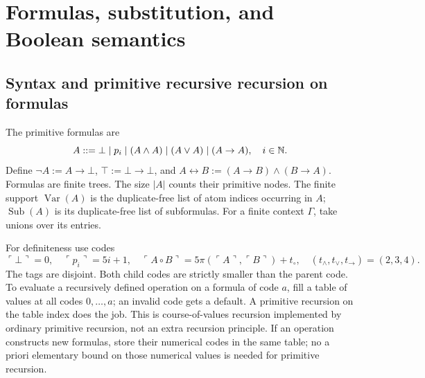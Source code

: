 \section{Formulas, substitution, and Boolean semantics}\label{sec:syntax}

\subsection{Syntax and primitive recursive recursion on formulas}

The primitive formulas are
\[
 A::=\bot\mid p_i\mid(A\wedge A)\mid(A\vee A)\mid(A\to A),\quad i\in\mathbb N.
\]
Define $\neg A:=A\to\bot$, $\top:=\bot\to\bot$, and
$A\leftrightarrow B:=(A\to B)\wedge(B\to A)$. Formulas are finite trees.
The size $|A|$ counts their primitive nodes. The finite support
$\operatorname{Var}(A)$ is the duplicate-free list of atom indices occurring
in $A$; $\operatorname{Sub}(A)$ is its duplicate-free list of subformulas.
For a finite context $\Gamma$, take unions over its entries.

For definiteness use codes
\[
 \ulcorner\bot\urcorner=0,\quad \ulcorner p_i\urcorner=5i+1,\quad
 \ulcorner A\circ B\urcorner=5\pi(\ulcorner A\urcorner,\ulcorner B\urcorner)+t_\circ,
 \quad (t_\wedge,t_\vee,t_\to)=(2,3,4).
\]
The tags are disjoint. Both child codes are strictly smaller than the parent
code. To evaluate a recursively defined operation on a formula of code $a$,
fill a table of values at all codes $0,\ldots,a$; an invalid code gets a
default. A primitive recursion on the table index does the job. This is
course-of-values recursion implemented by ordinary primitive recursion,
not an extra recursion principle. If an operation constructs new formulas,
store their numerical codes in the same table; no a priori elementary
bound on those numerical values is needed for primitive recursion.

